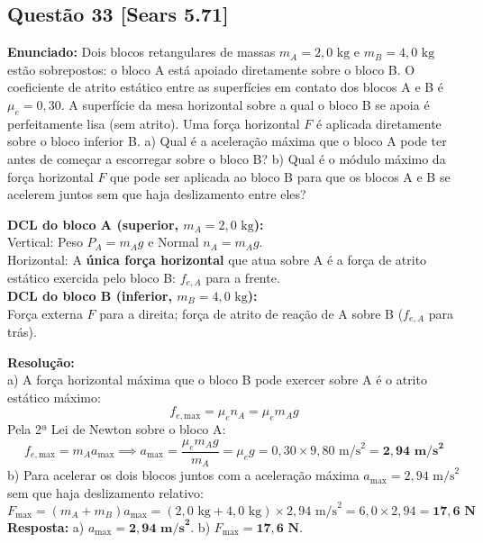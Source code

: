 \documentclass[11pt,a4paper]{article}
\begin{document}
\vspace{0.3cm}
\subsection*{Questão 33 [Sears 5.71]}
\textbf{Enunciado:} Dois blocos retangulares de massas $m_A = 2,0\text{ kg}$ e $m_B = 4,0\text{ kg}$ estão sobrepostos: o bloco A está apoiado diretamente sobre o bloco B. O coeficiente de atrito estático entre as superfícies em contato dos blocos A e B é $\mu_e = 0,30$. A superfície da mesa horizontal sobre a qual o bloco B se apoia é perfeitamente lisa (sem atrito). Uma força horizontal $F$ é aplicada diretamente sobre o bloco inferior B. a) Qual é a aceleração máxima que o bloco A pode ter antes de começar a escorregar sobre o bloco B? b) Qual é o módulo máximo da força horizontal $F$ que pode ser aplicada ao bloco B para que os blocos A e B se acelerem juntos sem que haja deslizamento entre eles?

\begin{dclbox}
\textbf{DCL do bloco A (superior, $m_A = 2,0\text{ kg}$):}\\
Vertical: Peso $P_A = m_A g$ e Normal $n_A = m_A g$.\\
Horizontal: A \textbf{única força horizontal} que atua sobre A é a força de atrito estático exercida pelo bloco B: $f_{e,A}$ para a frente.\\
\textbf{DCL do bloco B (inferior, $m_B = 4,0\text{ kg}$):}\\
Força externa $F$ para a direita; força de atrito de reação de A sobre B ($f_{e,A}$ para trás).
\end{dclbox}

\noindent
\textbf{Resolução:}\\
a) A força horizontal máxima que o bloco B pode exercer sobre A é o atrito estático máximo:
\[ f_{e,\text{max}} = \mu_e n_A = \mu_e m_A g \]
Pela 2ª Lei de Newton sobre o bloco A:
\[ f_{e,\text{max}} = m_A a_{\text{max}} \implies a_{\text{max}} = \frac{\mu_e m_A g}{m_A} = \mu_e g = 0,30 \times 9,80\text{ m/s}^2 = \mathbf{2,94\text{ m/s}^2} \]
b) Para acelerar os dois blocos juntos com a aceleração máxima $a_{\text{max}} = 2,94\text{ m/s}^2$ sem que haja deslizamento relativo:
\[ F_{\text{max}} = (m_A + m_B) a_{\text{max}} = (2,0\text{ kg} + 4,0\text{ kg}) \times 2,94\text{ m/s}^2 = 6,0 \times 2,94 = \mathbf{17,6\text{ N}} \]
\textbf{Resposta:} a) $a_{\text{max}} = \mathbf{2,94\text{ m/s}^2}$. b) $F_{\text{max}} = \mathbf{17,6\text{ N}}$.
\end{document}
